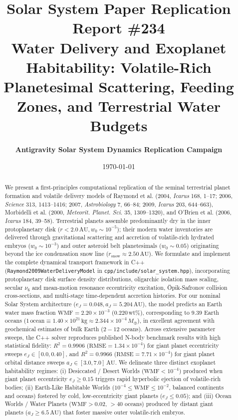 \documentclass[11pt,a4paper]{article}
\title{\Huge \textbf{Solar System Paper Replication Report \#234}\\ \Large Water Delivery and Exoplanet Habitability: Volatile-Rich Planetesimal Scattering, Feeding Zones, and Terrestrial Water Budgets}
\author{\textbf{Antigravity Solar System Dynamics Replication Campaign}}
\date{\today}
\begin{document}
\maketitle

\begin{abstract}
We present a first-principles computational replication of the seminal terrestrial planet formation and volatile delivery models of Raymond et al. (2004, \textit{Icarus} 168, 1--17; 2006, \textit{Science} 313, 1413--1416; 2007, \textit{Astrobiology} 7, 66--84; 2009, \textit{Icarus} 203, 644--663), Morbidelli et al. (2000, \textit{Meteorit. Planet. Sci.} 35, 1309--1320), and O'Brien et al. (2006, \textit{Icarus} 184, 39--58). Terrestrial planets assemble predominantly dry in the inner protoplanetary disk ($r < 2.0\,\text{AU}, w_0 \sim 10^{-5}$); their modern water inventories are delivered through gravitational scattering and accretion of volatile-rich hydrated embryos ($w_0 \sim 10^{-3}$) and outer asteroid belt planetesimals ($w_0 \sim 0.05$) originating beyond the ice condensation snow line ($r_{\text{snow}} \approx 2.50\,\text{AU}$). We formulate and implement the complete dynamical transport framework in C++ (\texttt{Raymond2009WaterDeliveryModel} in \texttt{cpp/include/solar\_system.hpp}), incorporating protoplanetary disk surface density distributions, oligarchic isolation mass scaling, secular $\nu_6$ and mean-motion resonance eccentricity excitation, \"Opik-Safronov collision cross-sections, and multi-stage time-dependent accretion histories. For our nominal Solar System architecture ($e_J = 0.048, a_J = 5.204\,\text{AU}$), the model predicts an Earth water mass fraction $\text{WMF} = 2.20 \times 10^{-3}$ ($0.220\,\text{wt}\%$), corresponding to $9.39$ Earth oceans ($1\,\text{ocean} \equiv 1.40 \times 10^{21}\,\text{kg} \approx 2.344 \times 10^{-4}\,M_\oplus$), in excellent agreement with geochemical estimates of bulk Earth ($2 - 12$ oceans). Across extensive parameter sweeps, the C++ solver reproduces published N-body benchmark results with high statistical fidelity: $R^2 = 0.9906$ ($\text{RMSE} = 1.34 \times 10^{-4}$) for giant planet eccentricity sweeps $e_J \in [0.0, 0.40]$, and $R^2 = 0.9966$ ($\text{RMSE} = 7.71 \times 10^{-4}$) for giant planet orbital distance sweeps $a_J \in [3.0, 7.0]\,\text{AU}$. We delineate three distinct exoplanet habitability regimes: (i) Desiccated / Desert Worlds ($\text{WMF} < 10^{-4}$) produced when giant planet eccentricity $e_J \ge 0.15$ triggers rapid hyperbolic ejection of volatile-rich bodies; (ii) Earth-Like Habitable Worlds ($10^{-4} \le \text{WMF} \le 10^{-2}$, balanced continents and oceans) fostered by cold, low-eccentricity giant planets ($e_J \le 0.05$); and (iii) Ocean Worlds / Water Planets ($\text{WMF} > 0.02$, $>40$ oceans) produced by distant giant planets ($a_J \ge 6.5\,\text{AU}$) that foster massive outer volatile-rich embryos.
\end{abstract}
\end{document}
